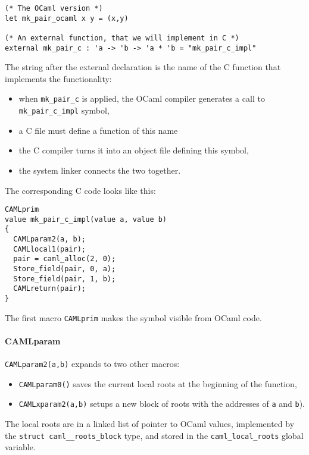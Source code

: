 \documentclass[a4paper]{easychair}
\begin{document}
\begin{lstlisting}[]
(* The OCaml version *)
let mk_pair_ocaml x y = (x,y)

(* An external function, that we will implement in C *)
external mk_pair_c : 'a -> 'b -> 'a * 'b = "mk_pair_c_impl"
\end{lstlisting}

The string after the external declaration is the name of the C function
that implements the functionality:

\begin{itemize}
\item when \texttt{mk\_pair\_c} is applied, the OCaml compiler generates a
      call to \texttt{mk\_pair\_c\_impl} symbol,
\item a C file must define a function of this name
\item the C compiler turns it into an object file defining this symbol,
\item the system linker connects the two together.
\end{itemize}

The corresponding C code looks like this:

\begin{lstlisting}[]
CAMLprim
value mk_pair_c_impl(value a, value b)
{
  CAMLparam2(a, b);
  CAMLlocal1(pair);
  pair = caml_alloc(2, 0);
  Store_field(pair, 0, a);
  Store_field(pair, 1, b);
  CAMLreturn(pair);
}
\end{lstlisting}

The first macro \texttt{CAMLprim} makes the symbol visible from OCaml
code.

\paragraph{CAMLparam} \texttt{CAMLparam2(a,b)} expands to two other macros:

\begin{itemize}
\item \texttt{CAMLparam0()} saves the current local roots at the beginning
      of the function,
\item \texttt{CAMLxparam2(a,b)} setups a new block of roots with the
      addresses of \texttt{a} and \texttt{b}).
\end{itemize}

The local roots are in a linked list of pointer to OCaml values,
implemented by the \texttt{struct\ caml\_\_roots\_block} type, and
stored in the \texttt{caml\_local\_roots} global variable.
\end{document}
